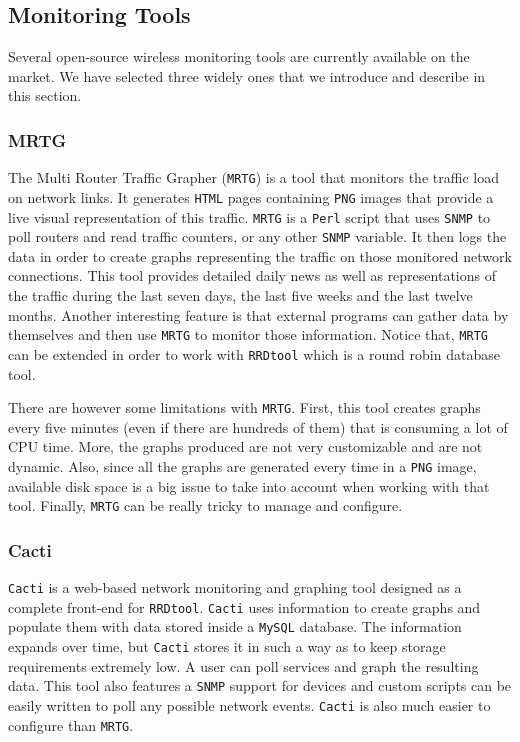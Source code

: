 \subsection{Monitoring Tools}
Several open-source wireless monitoring tools are currently available on the market. We have selected three widely ones that we introduce and describe in this section.

\subsubsection{MRTG}
The Multi Router Traffic Grapher (\texttt{MRTG}) \cite{mrtg} is a tool that monitors the traffic load on network links. It generates \texttt{HTML} pages containing \texttt{PNG} images that provide a live visual representation of this traffic. \texttt{MRTG} is a \texttt{Perl} script that uses \texttt{SNMP} to poll routers and read traffic counters, or any other \texttt{SNMP} variable. It then logs the data in order to create graphs representing the traffic on those monitored network connections. This tool provides detailed daily news as well as representations of the traffic during the last seven days, the last five weeks and the last twelve months. Another interesting feature is that external programs can gather data by themselves and then use \texttt{MRTG} to monitor those information. Notice that, \texttt{MRTG} can be extended in order to work with \texttt{RRDtool} \cite{rrdtool} which is a round robin database tool.

There are however some limitations with \texttt{MRTG}. First, this tool creates graphs every five minutes (even if there are hundreds of them) that is consuming a lot of CPU time. More, the graphs produced are not very customizable and are not dynamic. Also, since all the graphs are generated every time in a \texttt{PNG} image, available disk space is a big issue to take into account when working with that tool. Finally, \texttt{MRTG} can be really tricky to manage and configure.

\subsubsection{Cacti}
\texttt{Cacti} \cite{cacti} is a web-based network monitoring and graphing tool designed as a complete front-end for \texttt{RRDtool}. \texttt{Cacti} uses information to create graphs and populate them with data stored inside a \texttt{MySQL} database. The information expands over time, but \texttt{Cacti} stores it in such a way as to keep storage requirements extremely low. A user can poll services and graph the resulting data. This tool also features a \texttt{SNMP} support for devices and custom scripts can be easily written to poll any possible network events. \texttt{Cacti} is also much easier to configure than \texttt{MRTG}.

